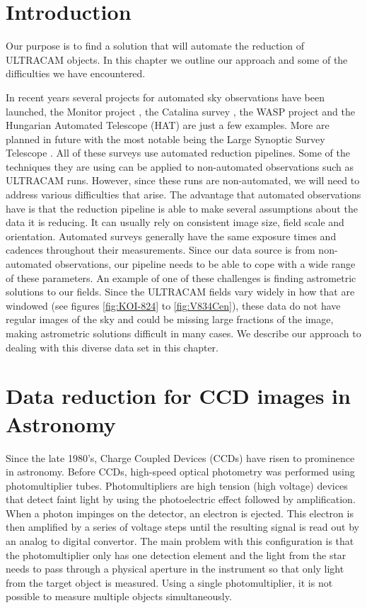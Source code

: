 \section{Introduction}
Our purpose is to find a solution that will automate the reduction of ULTRACAM objects. In this chapter we outline our approach and some of the difficulties we have encountered. 

In recent years several projects for automated sky observations have been launched, the Monitor project \citep{Irwin2007} , the Catalina survey \citep{CatalinaCatalog}, the WASP project \citep{PollaccoSuperWASP} and the Hungarian Automated Telescope (HAT) \citep{BakosHATNet} are just a few examples. More are planned in future with the most notable being the Large Synoptic Survey Telescope \citep{lsst}. All of these surveys use automated reduction pipelines. Some of the techniques they are using can be applied to non-automated observations such as ULTRACAM runs. However, since these runs are non-automated, we will need to address various difficulties that arise. The advantage that automated observations have is that the reduction pipeline is able to make several assumptions about the data it is reducing. It can usually rely on consistent image size, field scale and orientation. Automated surveys generally have the same exposure times and cadences throughout their measurements. Since our data source is from non-automated observations, our pipeline needs to be able to cope with a wide range of these parameters. An example of one of these challenges is finding astrometric solutions to our fields. Since the ULTRACAM fields vary widely in how that are windowed (see figures \ref{fig:KOI-824} to \ref{fig:V834Cen}), these data do not have regular images of the sky and could be missing large fractions of the image, making astrometric solutions difficult in many cases. We describe our approach to dealing with this diverse data set in this chapter. 

\section{Data reduction for CCD images in Astronomy}
Since the late 1980's, Charge Coupled Devices (CCDs) have risen to prominence in astronomy. Before CCDs, high-speed optical photometry was performed using photomultiplier tubes. Photomultipliers are high tension (high voltage) devices that detect faint light by using the photoelectric effect followed by amplification. When a photon impinges on the detector, an electron is ejected. This electron is then amplified by a series of voltage steps until the resulting signal is read out by an analog to digital convertor. The main problem with this configuration is that the photomultiplier only has one detection element and the light from the star needs to pass through a physical aperture in the instrument so that only light from the target object is measured. Using a single photomultiplier, it is not possible to measure multiple objects simultaneously. 

